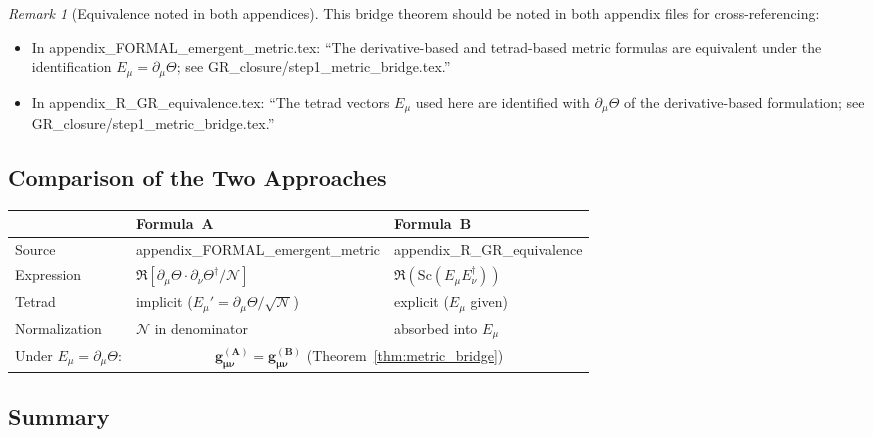 \documentclass[12pt]{article}
\theoremstyle{definition}
\theoremstyle{remark}
\newtheorem{remark}[theorem]{Remark}
\begin{document}
\begin{remark}[Equivalence noted in both appendices]
\label{rem:bridge_note}
This bridge theorem should be noted in both appendix files for cross-referencing:
\begin{itemize}
  \item In appendix\_FORMAL\_emergent\_metric.tex: ``The derivative-based and tetrad-based
        metric formulas are equivalent under the identification $E_\mu = \partial_\mu\Theta$;
        see GR\_closure/step1\_metric\_bridge.tex.''
  \item In appendix\_R\_GR\_equivalence.tex: ``The tetrad vectors $E_\mu$ used here
        are identified with $\partial_\mu\Theta$ of the derivative-based formulation;
        see GR\_closure/step1\_metric\_bridge.tex.''
\end{itemize}
\end{remark}

\subsection{Comparison of the Two Approaches}

\begin{center}
\begin{tabular}{lll}
\hline
& \textbf{Formula~A} & \textbf{Formula~B} \\
\hline
Source & appendix\_FORMAL\_emergent\_metric & appendix\_R\_GR\_equivalence \\
Expression & $\Re[\partial_\mu\Theta\cdot\partial_\nu\Theta^\dagger/\mathcal{N}]$ &
            $\Re(\mathrm{Sc}(E_\mu E_\nu^\dagger))$ \\
Tetrad & implicit ($E_\mu' = \partial_\mu\Theta/\sqrt{\mathcal{N}}$) &
         explicit ($E_\mu$ given) \\
Normalization & $\mathcal{N}$ in denominator & absorbed into $E_\mu$ \\
Under $E_\mu=\partial_\mu\Theta$: & \multicolumn{2}{c}{$\bm{g_{\mu\nu}^{(A)} = g_{\mu\nu}^{(B)}}$ \quad (Theorem~\ref{thm:metric_bridge})} \\
\hline
\end{tabular}
\end{center}

\subsection{Summary}
\end{document}
